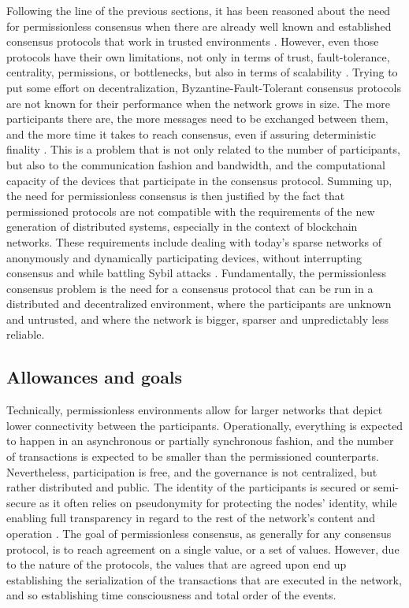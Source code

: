 \documentclass[journal]{IEEEtran}
\begin{document}
Following the line of the previous sections, it has been reasoned about the need 
for permissionless consensus when there are already well known and established consensus protocols
that work in trusted environments \cite{castro1999practical, miller2016honey}. However, even those protocols have
their own limitations, not only in terms of trust, fault-tolerance, centrality, permissions,
or bottlenecks, but also in terms of scalability \cite{miller2016honey}. Trying to put some effort on decentralization, 
Byzantine-Fault-Tolerant consensus protocols are not known for their performance when the network grows
in size. The more participants there are, the more messages need to be exchanged
between them, and the more time it takes to reach consensus, even if assuring deterministic finality \cite{decker2016bitcoin}. 
This is a problem that is not only related to the number of participants, but also to the
communication fashion and bandwidth, and the computational capacity of the devices that
participate in the consensus protocol. 
Summing up, the need for permissionless consensus is then justified by the fact that
permissioned protocols are not compatible with the requirements of the new generation of
distributed systems, especially in the context of blockchain networks. 
These requirements include dealing with today's sparse networks of anonymously and dynamically
participating devices, without interrupting consensus and while battling Sybil attacks \cite{survey-dist-consensus}.
Fundamentally, the permissionless consensus problem is the need for a consensus protocol that
can be run in a distributed and decentralized environment, where the participants are unknown and untrusted,
and where the network is bigger, sparser and unpredictably less reliable.

\subsection{Allowances and goals}

Technically, permissionless environments allow for larger networks
that depict lower connectivity between the participants. Operationally,
everything is expected to happen in an asynchronous or partially synchronous fashion, 
and the number of transactions is expected to be smaller than the 
permissioned counterparts. Nevertheless, participation is free, and the
governance is not centralized, but rather distributed and public. 
The identity of the participants is secured or semi-secure as it often relies on
pseudonymity for protecting the nodes' identity, while enabling full transparency 
in regard to the rest of the network's content and operation \cite{xiao2019distributed}.
The goal of permissionless consensus, as generally for any consensus protocol, is to reach
agreement on a single value, or a set of values. However, due to the nature of the
protocols, the values that are agreed upon end up establishing the serialization of the
transactions that are executed in the network, and so establishing time consciousness and 
total order of the events.
\end{document}
